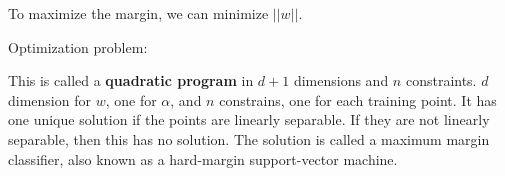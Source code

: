 To maximize the margin, we can minimize $||w||$.

Optimization problem:
\begin{center}
\end{center}
This is called a \textbf{quadratic program} in $d+1$ dimensions and $n$ constraints.
$d$ dimension for $w$, one for $\alpha$, and $n$ constrains, one for each training point.
It has one unique solution if the points are linearly separable.
If they are not linearly separable, then this has no solution.
The solution is called a maximum margin classifier, also known as a hard-margin support-vector machine.